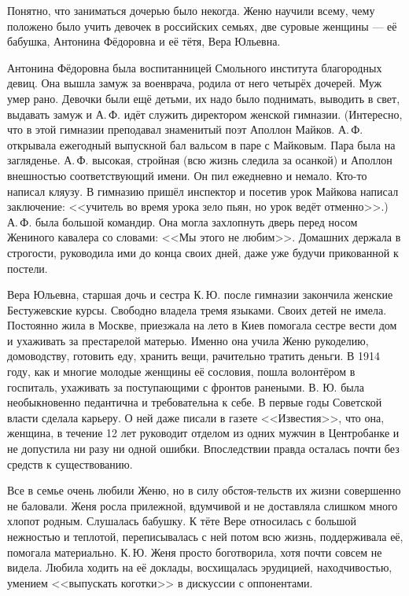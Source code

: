 Понятно, что заниматься дочерью было некогда.
Женю научили всему, чему положено было учить девочек в российских семьях, две суровые женщины --- её бабушка, Антонина Фёдоровна и её тётя, Вера Юльевна.

Антонина Фёдоровна была воспитанницей Смольного
\linebreak
института благородных девиц.
Она вышла замуж за военврача, родила от него четырёх дочерей. Муж умер рано. Девочки были ещё детьми, их надо было поднимать, выводить в свет, выдавать замуж и А.\,Ф. идёт служить директором женской гимназии. (Интересно, что в этой гимназии преподавал знаменитый поэт Аполлон Майков. А.\,Ф. открывала ежегодный выпускной бал вальсом в паре с Майковым. Пара была на загляденье. А.\,Ф. высокая, стройная (всю жизнь следила за осанкой) и Аполлон внешностью соответствующий имени. Он пил ежедневно и немало. Кто-то написал кляузу. В гимназию пришёл инспектор и посетив урок Майкова написал заключение: <<учитель во время урока зело пьян, но урок ведёт отменно>>.) А.\,Ф. была большой командир. Она могла захлопнуть дверь перед носом Жениного кавалера со словами: <<Мы этого не любим>>. Домашних держала в строгости, руководила ими до конца своих дней, даже уже будучи прикованной к постели.

Вера Юльевна, старшая дочь и сестра К.\,Ю. после гимназии закончила женские Бестужевские курсы. Свободно владела тремя языками. Своих детей не имела. Постоянно жила в Москве, приезжала на лето в Киев помогала сестре вести дом и ухаживать за престарелой матерью. Именно она учила Женю рукоделию, домоводству, готовить еду, хранить вещи, рачительно тратить деньги. В 1914 году, как и многие молодые женщины её сословия, пошла волонтёром в госпиталь, ухаживать за поступающими с фронтов ранеными. В. Ю. была необыкновенно педантична и требовательна к себе. В первые годы Советской власти сделала карьеру. О ней даже писали в газете <<Известия>>, что она, женщина, в течение 12 лет руководит отделом из одних мужчин в Центробанке и не допустила ни разу ни одной ошибки. Впоследствии правда осталась почти без средств к существованию.

Все в семье очень любили Женю, но в силу
обстоя-\linebreak тельств
их жизни совершенно не баловали.
Женя росла прилежной, вдумчивой и не доставляла слишком много хлопот родным. Слушалась бабушку. К тёте Вере относилась с большой нежностью и теплотой, переписывалась с ней потом всю жизнь, поддерживала её, помогала материально. К.\,Ю. Женя просто боготворила, хотя почти совсем не видела. Любила ходить на её доклады, восхищалась эрудицией, находчивостью, умением <<выпускать коготки>> в дискуссии с оппонентами.

